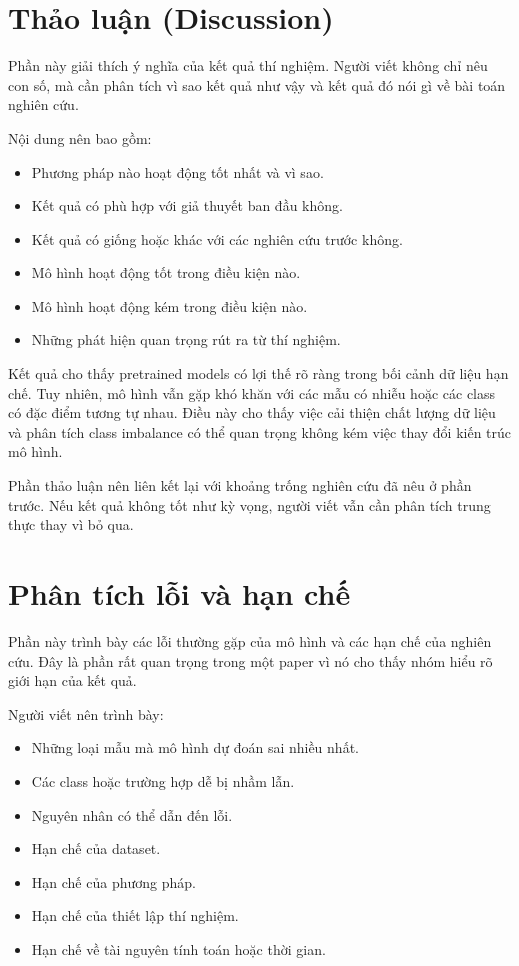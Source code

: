 \documentclass[12pt]{ai_conquer2026}
\begin{document}
\section{Thảo luận (Discussion)}

Phần này giải thích ý nghĩa của kết quả thí nghiệm. Người viết không chỉ nêu con số, mà cần phân tích vì sao kết quả như vậy và kết quả đó nói gì về bài toán nghiên cứu.

Nội dung nên bao gồm:

\begin{itemize}
\item Phương pháp nào hoạt động tốt nhất và vì sao.
\item Kết quả có phù hợp với giả thuyết ban đầu không.
\item Kết quả có giống hoặc khác với các nghiên cứu trước không.
\item Mô hình hoạt động tốt trong điều kiện nào.
\item Mô hình hoạt động kém trong điều kiện nào.
\item Những phát hiện quan trọng rút ra từ thí nghiệm.
\end{itemize}

\begin{aivncodebox}[Ví dụ:]
Kết quả cho thấy pretrained models có lợi thế rõ ràng trong bối cảnh dữ liệu hạn chế. Tuy nhiên, mô hình vẫn gặp khó khăn với các mẫu có nhiễu hoặc các class có đặc điểm tương tự nhau. Điều này cho thấy việc cải thiện chất lượng dữ liệu và phân tích class imbalance có thể quan trọng không kém việc thay đổi kiến trúc mô hình.
\end{aivncodebox}

Phần thảo luận nên liên kết lại với khoảng trống nghiên cứu đã nêu ở phần trước. Nếu kết quả không tốt như kỳ vọng, người viết vẫn cần phân tích trung thực thay vì bỏ qua.

\section{Phân tích lỗi và hạn chế}

Phần này trình bày các lỗi thường gặp của mô hình và các hạn chế của nghiên cứu. Đây là phần rất quan trọng trong một paper vì nó cho thấy nhóm hiểu rõ giới hạn của kết quả.

Người viết nên trình bày:

\begin{itemize}
\item Những loại mẫu mà mô hình dự đoán sai nhiều nhất.
\item Các class hoặc trường hợp dễ bị nhầm lẫn.
\item Nguyên nhân có thể dẫn đến lỗi.
\item Hạn chế của dataset.
\item Hạn chế của phương pháp.
\item Hạn chế của thiết lập thí nghiệm.
\item Hạn chế về tài nguyên tính toán hoặc thời gian.
\end{itemize}
\end{document}
